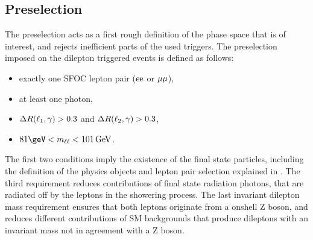 \subsection{Preselection}
The preselection acts as a first rough definition of the phase space that is of interest, and rejects inefficient parts of the used triggers. The preselection imposed on the dilepton triggered events is defined as follows:
\begin{itemize}
 \item exactly one SFOC lepton pair ($\mathrm{e}\mathrm{e}$ or $\mu\mu$),
 \item at least one photon,
 \item $\Delta R(\ell_1,\gamma)>0.3$ and $\Delta R(\ell_2,\gamma)>0.3$,
 \item $81\geV<m_{\ell\ell}<101\GeV$.
\end{itemize}
The first two conditions imply the existence of the final state particles, including the definition of the physics objects and lepton pair selection explained in . The third requirement reduces contributions of final state radiation photons, that are radiated off by the leptons in the showering process. The last invariant dilepton mass requirement ensures that both leptons originate from a onshell Z boson, and reduces different contributions of SM backgrounds that produce dileptons with an invariant mass not in agreement with a Z boson.

